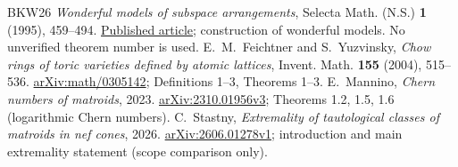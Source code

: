 \documentclass[12pt]{amsart}
\theoremstyle{definition}
\theoremstyle{remark}
\numberwithin{equation}{section}
\begin{document}
\begin{thebibliography}{BKW26}
\emph{Wonderful models of subspace arrangements}, Selecta Math. (N.S.) \textbf{1} (1995), 459--494.
\href{https://doi.org/10.1007/BF01589496}{Published article}; construction of wonderful models. No unverified theorem number is used.
 E.~M.~Feichtner and S.~Yuzvinsky,
\emph{Chow rings of toric varieties defined by atomic lattices}, Invent. Math. \textbf{155} (2004), 515--536.
\href{https://arxiv.org/abs/math/0305142}{arXiv:math/0305142};
Definitions 1--3, Theorems 1--3.
 E.~Mannino,
\emph{Chern numbers of matroids}, 2023.
\href{https://arxiv.org/abs/2310.01956v3}{arXiv:2310.01956v3};
Theorems 1.2, 1.5, 1.6 (logarithmic Chern numbers).
 C.~Stastny,
\emph{Extremality of tautological classes of matroids in nef cones}, 2026.
\href{https://arxiv.org/abs/2606.01278v1}{arXiv:2606.01278v1}; introduction and main extremality statement (scope comparison only).
\end{thebibliography}
\end{document}
